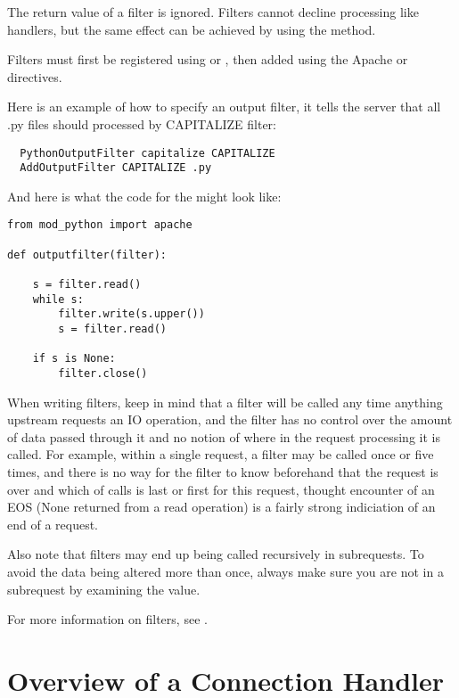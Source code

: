 The return value of a filter is ignored. Filters cannot decline
processing like handlers, but the same effect can be achieved
by using the  method.

Filters must first be registered using  or
, then added using the Apache
 or  directives. 

Here is an example of how to specify an output filter, it tells the
server that all .py files should processed by CAPITALIZE filter:

\begin{verbatim}
  PythonOutputFilter capitalize CAPITALIZE
  AddOutputFilter CAPITALIZE .py
\end{verbatim}

And here is what the code for the  might look
like:

\begin{verbatim}
from mod_python import apache

def outputfilter(filter):

    s = filter.read()
    while s:
        filter.write(s.upper())
        s = filter.read()

    if s is None:
        filter.close()

\end{verbatim}

When writing filters, keep in mind that a filter will be called any
time anything upstream requests an IO operation, and the filter has no
control over the amount of data passed through it and no notion of
where in the request processing it is called. For example, within a
single request, a filter may be called once or five times, and there
is no way for the filter to know beforehand that the request is over
and which of calls is last or first for this request, thought
encounter of an EOS (None returned from a read operation) is a fairly
strong indiciation of an end of a request.

Also note that filters may end up being called recursively in
subrequests. To avoid the data being altered more than once, always
make sure you are not in a subrequest by examining the 
value.

For more information on filters, see
.

\section{Overview of a Connection Handler\label{pyapi-conn}}

